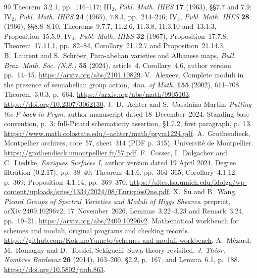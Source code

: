 \documentclass[11pt]{article}
\theoremstyle{remark}\newtheorem{remark}[theorem]{Remark}
\newcommand{\workbenchurl}{https://github.com/KokunoYumeto/schemes-and-moduli-workbench}
\begin{document}
\begin{thebibliography}{99}
Theorem~3.2.1, pp.~116--117;
III$_2$, \emph{Publ. Math. IHES} \textbf{17} (1963),
\S\S7.7 and 7.9;
IV$_2$, \emph{Publ. Math. IHES} \textbf{24} (1965),
7.8.3, pp.~214--216;
IV$_3$, \emph{Publ. Math. IHES} \textbf{28} (1966),
\S\S8.8--8.10, Theorems~9.7.7, 11.2.6, 11.3.8, 11.3.10 and~13.1.3,
Proposition~15.5.9;
IV$_4$, \emph{Publ. Math. IHES} \textbf{32} (1967),
Proposition~17.7.8, Theorem~17.11.1, pp.~82--84,
Corollary~21.12.7 and Proposition~21.14.3.
B.~Laurent and S.~Schr\"oer, Para-abelian varieties and Albanese maps,
\emph{Bull. Braz. Math. Soc. (N.S.)} \textbf{55} (2024), article~4.
Corollary~4.6, author version pp.~14--15.
\url{https://arxiv.org/abs/2101.10829}.
V.~Alexeev, Complete moduli in the presence of semiabelian group action,
\emph{Ann. of Math.} \textbf{155} (2002), 611--708.
Theorem~3.0.3, p.~664.
\url{https://arxiv.org/abs/math/9905103};
\url{https://doi.org/10.2307/3062130}.
J.~D.~Achter and S.~Casalaina-Martin,
\emph{Putting the P back in Prym}, author manuscript dated
18~December~2024. Standing base convention, p.~3;
full-Picard schematicity assertion, \S1.7.2, first paragraph, p.~13.
\url{https://www.math.colostate.edu/~achter/math/prym1224.pdf}.
 A.~Grothendieck, Montpellier archives, cote~57, sheet~314 (PDF p.~315), Universit\'e de Montpellier. \url{https://grothendieck.umontpellier.fr/57.pdf}.
F.~Cossec, I.~Dolgachev and C.~Liedtke, \emph{Enriques Surfaces I},
author version dated 19 April 2024. Degree filtration (0.2.17), pp.~38--40; Theorem~4.1.6, pp.~364--365;
Corollary~4.1.12, p.~369; Proposition~4.1.14, pp.~369--370.
\url{https://sites.lsa.umich.edu/idolga/wp-content/uploads/sites/1334/2024/08/EnriquesOne.pdf}.
X.~Su and B.~Wang, \emph{Picard Groups of Spectral Varieties and Moduli of Higgs Sheaves}, preprint, arXiv:2409.10296v2, 17~November~2026.
Lemmas~3.22--3.23 and Remark~3.24, pp.~19--21.
\url{https://arxiv.org/abs/2409.10296v2}.
 Mathematical workbench for schemes and moduli, original programs and checking records. \url{\workbenchurl}.
 A.~M\'ezard, M.~Romagny and D.~Tossici,
Sekiguchi--Suwa theory revisited, \emph{J. Th\'eor. Nombres Bordeaux}
\textbf{26} (2014), 163--200. \S2.2, p.~167, and Lemma~6.1, p.~188.
\url{https://doi.org/10.5802/jtnb.863}.


\end{thebibliography}
\end{document}
